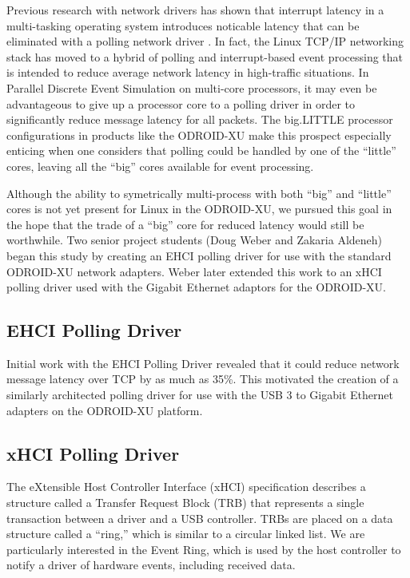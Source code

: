 \documentclass[11pt]{book}
\begin{document}
Previous research with network drivers has shown that interrupt latency in a multi-tasking
operating system introduces noticable latency that can be eliminated with a polling
network driver \cite{dovrolis-01,liu-09}.  In fact, the Linux TCP/IP networking stack has
moved to a hybrid of polling and interrupt-based event processing that is intended to
reduce average network latency in high-traffic situations.  In Parallel Discrete Event
Simulation on multi-core processors, it may even be advantageous to give up a processor
core to a polling driver in order to significantly reduce message latency for all packets.
The big.LITTLE processor configurations in products like the ODROID-XU make this prospect
especially enticing when one considers that polling could be handled by one of the
``little'' cores, leaving all the ``big'' cores available for event processing.

Although the ability to symetrically multi-process with both ``big'' and ``little'' cores
is not yet present for Linux in the ODROID-XU, we pursued this goal in the hope that the
trade of a ``big'' core for reduced latency would still be worthwhile.  Two senior project
students (Doug Weber and Zakaria Aldeneh) began this study by creating an EHCI polling
driver for use with the standard ODROID-XU network adapters.  Weber later extended this
work to an xHCI polling driver used with the Gigabit Ethernet adaptors for the ODROID-XU.

\subsection{EHCI Polling Driver}

Initial work with the EHCI Polling Driver revealed that it could reduce network message
latency over TCP by as much as 35\%.  This motivated the creation of a similarly
architected polling driver for use with the USB 3 to Gigabit Ethernet adapters on the
ODROID-XU platform.

\subsection{xHCI Polling Driver}

The eXtensible Host Controller Interface (xHCI) specification \cite{xhci} describes a
structure called a Transfer Request Block (TRB) that represents a single transaction
between a driver and a USB controller.  TRBs are placed on a data structure called a
``ring,'' which is similar to a circular linked list.  We are particularly interested in
the Event Ring, which is used by the host controller to notify a driver of hardware
events, including received data.
\end{document}
